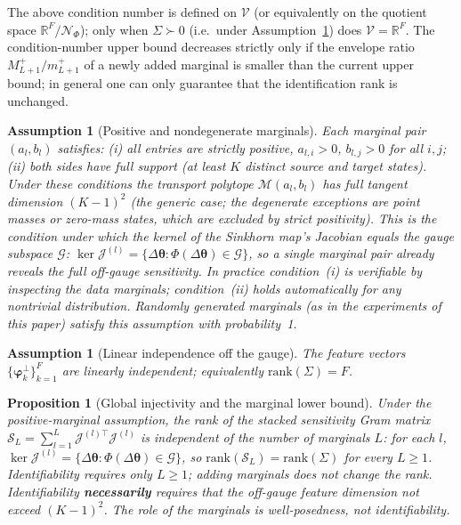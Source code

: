 \documentclass[11pt,a4paper]{article}
\newtheorem{proposition}[theorem]{Proposition}
\newtheorem{assumption}[theorem]{Assumption}
\theoremstyle{remark}
\renewcommand{\phi}{\bm{\varphi}}
\begin{document}
The above condition number is defined on $\mathcal V$ (or equivalently on the quotient
space $\mathbb{R}^F/\mathcal{N}_\Phi$); only when $\Sigma\succ0$ (i.e.\ under
Assumption~\ref{asm:A1}) does $\mathcal V=\mathbb{R}^F$. The condition-number upper bound
decreases strictly only if the envelope ratio $M_{L+1}^{+}/m_{L+1}^{+}$ of a newly added
marginal is smaller than the current upper bound; in general one can only guarantee that
the identification rank is unchanged.

\begin{assumption}[Positive and nondegenerate marginals]\label{asm:genpos}
Each marginal pair $(a_l,b_l)$ satisfies: (i) all entries are strictly positive,
$a_{l,i}>0$, $b_{l,j}>0$ for all $i,j$; (ii) both sides have full support (at least $K$
distinct source and target states). Under these conditions the transport polytope
$\mathcal{M}(a_l,b_l)$ has full tangent dimension $(K-1)^2$ (the generic case; the
degenerate exceptions are point masses or zero-mass states, which are excluded by strict
positivity). This is the condition under which the kernel of the Sinkhorn map's Jacobian
equals the gauge subspace $\mathcal{G}$:
$\ker\mathcal{J}^{(l)}=\{\Delta\bm{\theta}:\Phi(\Delta\bm{\theta})\in\mathcal{G}\}$, so a
single marginal pair already reveals the full off-gauge sensitivity. In practice
condition~(i) is verifiable by inspecting the data marginals; condition~(ii) holds
automatically for any nontrivial distribution. Randomly generated marginals (as in the
experiments of this paper) satisfy this assumption with probability~1.
\end{assumption}

\begin{assumption}[Linear independence off the gauge]\label{asm:A1}
The feature vectors $\{\phi_k^{\perp}\}_{k=1}^F$ are linearly independent; equivalently
$\mathrm{rank}(\Sigma)=F$.
\end{assumption}

\begin{proposition}[Global injectivity and the marginal lower bound]
Under the positive-marginal assumption, the rank of the stacked sensitivity Gram matrix
$\mathcal{S}_L=\sum_{l=1}^L \mathcal{J}^{(l)\top}\mathcal{J}^{(l)}$ is independent of the
number of marginals $L$: for each $l$,
$\ker\mathcal{J}^{(l)}=\{\Delta\bm{\theta}:\Phi(\Delta\bm{\theta})\in\mathcal{G}\}$, so
$\mathrm{rank}(\mathcal{S}_L)=\mathrm{rank}(\Sigma)$ for every $L\ge1$. Identifiability
requires only $L\ge1$; adding marginals does not change the rank. Identifiability
\textbf{necessarily} requires that the off-gauge feature dimension not exceed $(K-1)^2$.
The role of the marginals is well-posedness, not identifiability.
\end{proposition}
\end{document}
